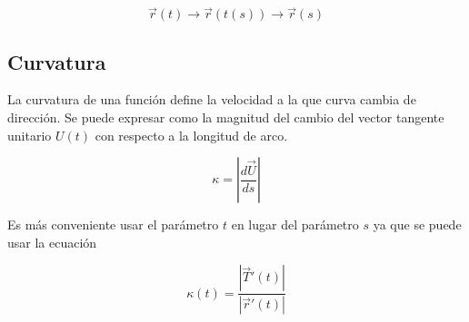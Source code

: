 \documentclass[12pt]{article}
\begin{document}
\begin{equation}
 \vec{r}(t) \rightarrow \vec{r}(t(s)) \rightarrow \vec{r}(s)
\end{equation}

\subsection{Curvatura}

La curvatura de una funci\'{o}n define la velocidad a la que curva cambia de direcci\'{o}n. Se puede expresar como la magnitud del cambio del vector tangente unitario
$U(t)$ con respecto a la longitud de arco.

\begin{equation}
 \kappa = \left|\frac{d\vec{U}}{ds}\right|
\end{equation}

Es m\'{a}s conveniente usar el par\'{a}metro $t$ en lugar del par\'{a}metro $s$ ya que se puede usar la ecuaci\'{o}n

\begin{equation}
 \kappa(t) = \frac{|\vec{T}'(t)|}{|\vec{r}'(t)|}
\end{equation}
\end{document}
